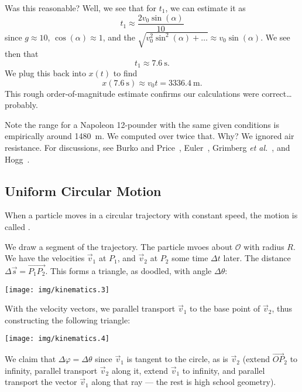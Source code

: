 \begin{soln}
\EVALUATE
Was this reasonable? Well, we see that for $t_{1}$,
we can estimate it as
\begin{equation}
t_{1}\approx \frac{2v_{0}\sin(\alpha)}{10}
\end{equation}
since $g\approx 10$, $\cos(\alpha)\approx 1$, and the
$\sqrt{v_{0}^{2}\sin^{2}(\alpha)+\dots}\approx
v_{0}\sin(\alpha)$. We see then that
\begin{equation}
t_{1}\approx \SI{7.6}{\second}.
\end{equation}
We plug this back into $x(t)$ to find
\begin{equation}
x(\SI{7.6}{\second})\approx v_{0}t = \SI{3336.4}{\meter}.
\end{equation}
This rough order-of-magnitude estimate confirms our calculations were
correct\dots probably.
\end{soln}

\begin{remark}
Note the range for a Napoleon 12-pounder with the same given conditions
is empirically around \SI{1480}{\meter}. We computed over twice
that. Why? We ignored air resistance. For discussions, see
Burko and Price~\cite{burko2003}, Euler~\cite{e77,e217,e226,e853},
Grimberg \emph{et al.}~\cite{grimberg2008}, and Hogg~\cite{hogg2007}.
\end{remark}

\subsection{Uniform Circular Motion}

When a particle moves in a circular trajectory with constant speed, the
motion is called .

\label{M:kinematics:uniform-circular-motion:derivation-of-acceleration}
We draw a segment of the trajectory. The particle mvoes about
$\mathcal{O}$ with radius $R$. We have the velocities $\vec{v}_{1}$ at
$P_{1}$, and $\vec{v}_{2}$ at $P_{2}$ some time $\Delta t$ later. The
distance $\Delta\vec{s}=\overrightarrow{P_{1}P_{2}}$. This forms a triangle, as
doodled, with angle $\Delta\theta$:
\begin{center}
\texttt{[image: img/kinematics.3]}
\end{center}
With the velocity vectors, we parallel transport $\vec{v}_{1}$ to the
base point of $\vec{v}_{2}$, thus constructing the following triangle:
\begin{center}
\texttt{[image: img/kinematics.4]}
\end{center}
We claim that $\Delta\varphi=\Delta\theta$ since $\vec{v}_{1}$ is
tangent to the circle, as is $\vec{v}_{2}$ (extend
$\overrightarrow{OP}_{2}$ to infinity, parallel transport $\vec{v}_{2}$
along it, extend $\vec{v}_{1}$ to infinity, and parallel transport the
vector $\vec{v}_{1}$ along that ray --- the rest is high school geometry).

